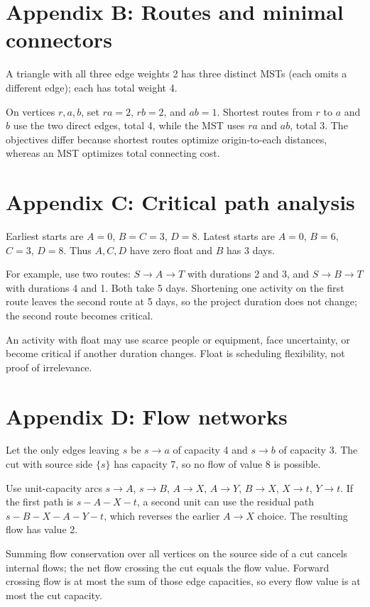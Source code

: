 \section*{Appendix B: Routes and minimal connectors}
\begin{description}[style=nextline]
\item[B.1] A triangle with all three edge weights 2 has three distinct MSTs (each omits a different edge); each has total weight 4.
\item[B.2] On vertices $r,a,b$, set $ra=2$, $rb=2$, and $ab=1$. Shortest routes from $r$ to $a$ and $b$ use the two direct edges, total 4, while the MST uses $ra$ and $ab$, total 3. The objectives differ because shortest routes optimize origin-to-each distances, whereas an MST optimizes total connecting cost.
\end{description}

\section*{Appendix C: Critical path analysis}
\begin{description}[style=nextline]
\item[C.1] Earliest starts are $A=0$, $B=C=3$, $D=8$. Latest starts are $A=0$, $B=6$, $C=3$, $D=8$. Thus $A,C,D$ have zero float and $B$ has 3 days.
\item[C.2] For example, use two routes: $S\to A\to T$ with durations 2 and 3, and $S\to B\to T$ with durations 4 and 1. Both take 5 days. Shortening one activity on the first route leaves the second route at 5 days, so the project duration does not change; the second route becomes critical.
\item[C.3] An activity with float may use scarce people or equipment, face uncertainty, or become critical if another duration changes. Float is scheduling flexibility, not proof of irrelevance.
\end{description}

\section*{Appendix D: Flow networks}
\begin{description}[style=nextline]
\item[D.1] Let the only edges leaving $s$ be $s\to a$ of capacity 4 and $s\to b$ of capacity 3. The cut with source side $\{s\}$ has capacity 7, so no flow of value 8 is possible.
\item[D.2] Use unit-capacity arcs $s\to A$, $s\to B$, $A\to X$, $A\to Y$, $B\to X$, $X\to t$, $Y\to t$. If the first path is $s-A-X-t$, a second unit can use the residual path $s-B-X-A-Y-t$, which reverses the earlier $A\to X$ choice. The resulting flow has value 2.
\item[D.3] Summing flow conservation over all vertices on the source side of a cut cancels internal flows; the net flow crossing the cut equals the flow value. Forward crossing flow is at most the sum of those edge capacities, so every flow value is at most the cut capacity.
\end{description}

